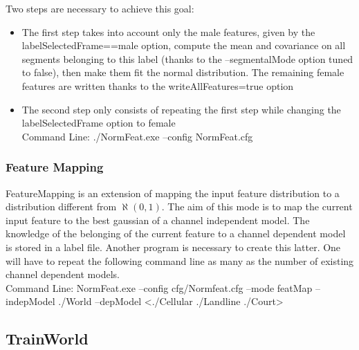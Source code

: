 \documentclass[a4paper]{article}
\begin{document}
Two steps are necessary to achieve this goal:
\begin{itemize}
\item The first step takes into account only the male features, given by the labelSelectedFrame==male  option, compute the mean and covariance on all segments belonging to this label (thanks to the  --segmentalMode option tuned to false), then make them fit the normal distribution. The remaining female features are written thanks to the writeAllFeatures=true option
\item The second step only consists of repeating the first step while changing the labelSelectedFrame option to female\\
Command Line: ./NormFeat.exe --config NormFeat.cfg
\end{itemize}

\subsubsection{Feature Mapping}
FeatureMapping is an extension of mapping the input feature
distribution to a distribution different from $\aleph(0,1)$. The aim
of this mode is to map the current input feature to the best
gaussian of a channel independent model. The knowledge of the
belonging of the current feature to a channel dependent model is
stored in a label file. Another program is necessary to create this
latter.
One will have to repeat the following command line as many as the number of existing channel dependent models.\\
Command Line: NormFeat.exe --config cfg/Normfeat.cfg --mode featMap --indepModel ./World --depModel <./Cellular ./Landline ./Court>

\subsection{TrainWorld}
\end{document}
